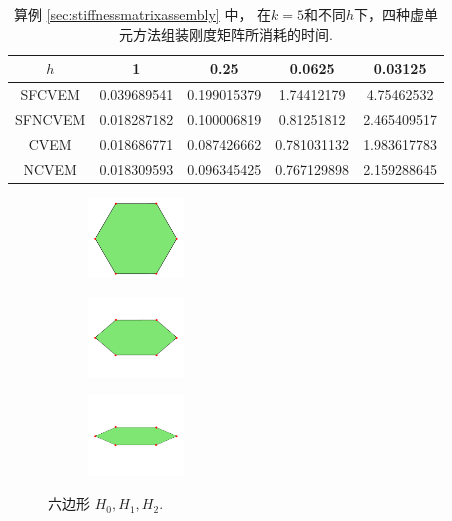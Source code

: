 \begin{table}[H]
    \caption{算例 \ref{sec:stiffnessmatrixassembly} 中，
    在$k = 5$和不同$h$下，四种虚单元方法组装刚度矩阵所消耗的时间.}
\label{tab:ttime}
\centering
\begin{tabular}{c|cccc}
\hline
$h$ & 1 & 0.25 & 0.0625 & 0.03125 \\
\hline
SFCVEM & 0.039689541 & 0.199015379 & 1.74412179 & 4.75462532 \\
SFNCVEM & 0.018287182 & 0.100006819 & 0.81251812 & 2.465409517 \\
CVEM & 0.018686771 & 0.087426662 & 0.781031132 & 1.983617783 \\
NCVEM & 0.018309593 & 0.096345425 & 0.767129898 & 2.159288645 \\
\hline
\end{tabular}
\end{table}

\begin{figure}[H]
\centering
\begin{subfigure}[t]{0.3\linewidth}
    \centering
    \includegraphics[width=1in]{./figures/stabfree/hexagon0.pdf}
\end{subfigure}%
\hspace{0.5cm}
\begin{subfigure}[t]{0.3\linewidth}
    \centering
    \includegraphics[width=1in]{./figures/stabfree/hexagon3.pdf}
\end{subfigure}%
\hspace{0.5cm}
\begin{subfigure}[t]{0.3\linewidth}
    \centering
    \includegraphics[width=1in]{./figures/stabfree/hexagon4.pdf}
\end{subfigure}
\caption{六边形 $H_0, H_1, H_2$.}
\label{fig:collapsehexagon}
\end{figure}

